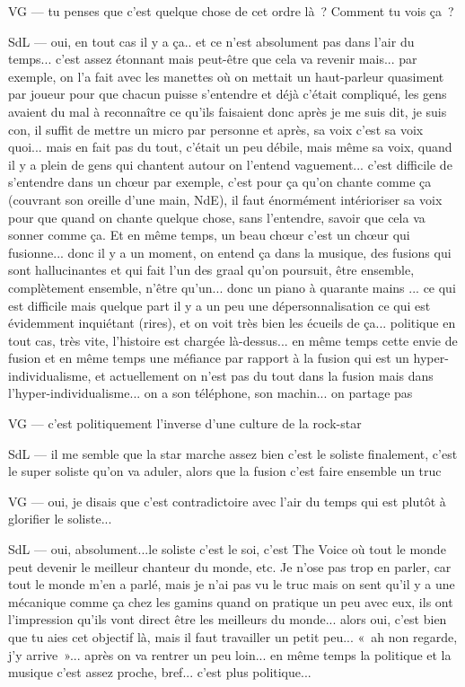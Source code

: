 VG — tu penses que c'est quelque chose de cet ordre là ? Comment tu vois ça ? 

SdL — oui, en tout cas il y a ça.. et ce n'est absolument pas dans l'air du temps... c'est assez étonnant mais peut-être que cela va revenir mais... par exemple, on l'a fait avec les manettes où on mettait un haut-parleur quasiment par joueur pour que chacun puisse s'entendre et déjà c'était compliqué, les gens avaient du mal à reconnaître ce qu'ils faisaient donc après je me suis dit, je suis con, il suffit de mettre un micro par personne et après, sa voix c'est sa voix quoi... mais en fait pas du tout, c'était un peu débile, mais même sa voix, quand il y a plein de gens qui chantent autour on l'entend vaguement... c'est difficile de s'entendre dans un chœur par exemple, c'est pour ça qu'on chante comme ça (couvrant son oreille d'une main, NdE), il faut énormément intérioriser sa voix pour que quand on chante quelque chose, sans l'entendre,  savoir que cela va sonner comme ça. Et en même temps, un beau chœur c'est un chœur qui fusionne... donc il y a un moment, on entend ça dans la musique, des fusions qui sont hallucinantes et qui fait l'un des graal qu'on poursuit, être ensemble, complètement ensemble, n'être qu'un... donc un piano à quarante mains ... ce qui est difficile mais quelque part il y a un peu une dépersonnalisation ce qui est évidemment inquiétant (rires), et on voit très bien les écueils de ça... politique en tout cas, très vite, l'histoire est chargée là-dessus... en même temps cette envie de fusion et en même temps une méfiance par rapport à la fusion qui est un hyper-individualisme, et actuellement on n'est pas du tout dans la fusion mais dans l'hyper-individualisme... on a son téléphone, son machin... on partage pas 

VG — c'est politiquement l'inverse d'une culture de la rock-star 

SdL — il me semble que la star marche assez bien c'est le soliste finalement, c'est le super soliste qu'on va aduler, alors que la fusion c'est faire ensemble un truc 

VG — oui, je disais que c'est contradictoire avec l'air du temps qui est plutôt à glorifier le soliste... 

SdL — oui, absolument...le soliste c'est le soi, c'est The Voice où tout le monde peut devenir le meilleur chanteur du monde, etc. Je n'ose pas trop en parler, car tout le monde m'en a parlé, mais je n'ai pas vu le truc mais on sent qu'il y a une mécanique comme ça chez les gamins quand on pratique un peu avec eux, ils ont l'impression qu'ils vont direct être les meilleurs du monde... alors oui, c'est bien que tu aies cet objectif là, mais il faut travailler un petit peu...  « ah non regarde, j'y arrive »... après on va rentrer un peu loin... en même temps la politique et la musique c'est assez proche, bref... c'est plus politique...  

